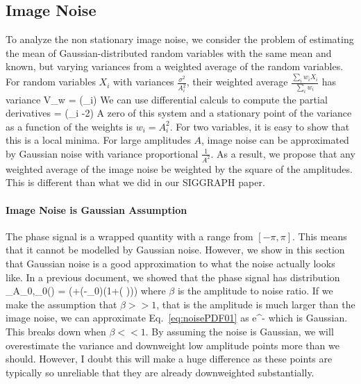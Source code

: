 \documentclass[letterpaper, 10pt]{article}
\numberwithin{equation}{section}
\begin{document}
\subsection{Image Noise}
To analyze the non stationary image noise, we consider the problem of estimating the mean of Gaussian-distributed random variables with the same mean and known, but varying variances from a weighted average of the random variables. For random variables $X_i$ with variances $\frac{\sigma^2}{A_i^2}$, their weighted average $\frac{\sum_i w_iX_i}{\sum_i w_i}$ has variance
\beq  V_w =  \left(\sum_i\right)\eeq
We can use differential calculs to compute the partial derivatives
\beq {} = \left(\sum_i -2\right)\eeq
A zero of this system and a stationary point of the variance as a function of the weights is $w_i = A_i^2$. For two variables, it is easy to show that this is a local minima. For large amplitudes $A$, image noise can be approximated by Gaussian noise with variance proportional $\frac{1}{A^2}$. As a result, we propose that any weighted average of the image noise be weighted by the square of the amplitudes. This is different than what we did in our SIGGRAPH paper.  

\paragraph{Image Noise is Gaussian Assumption}
The phase signal is a wrapped quantity with a range from $[-\pi,\pi]$. This means that it cannot be modelled by Gaussian noise. However, we show in this section that Gaussian noise is a good approximation to what the noise actually looks like. In a previous document, we showed that the phase signal has distribution 
\beq {}_{A_0,\theta_0}(\theta) =  \left(+\beta\cos(\theta-\theta_0)\left(1+\left( \right)\right)\right) \label{eq:noisePDF01}\eeq
where $\beta$ is the amplitude to noise ratio. If we make the assumption that $\beta >>1$, that is the amplitude is much larger than the image noise, we can approximate Eq.~\ref{eq:noisePDF01} as
\beq \frac{\beta}{\sqrt{2\pi}} e^{-}\eeq
which is Gaussian. This breaks down when $\beta<<1$. By assuming the noise is Gaussian, we will overestimate the variance and downweight low amplitude points more than we should. However, I doubt this will make a huge difference as these points are typically so unreliable that they are already downweighted substantially.
\end{document}
